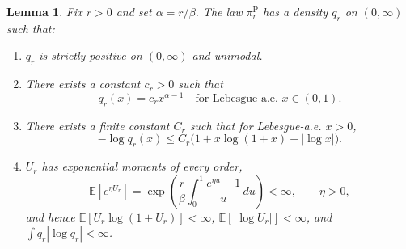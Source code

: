 \documentclass{article}
\newtheorem{lemma}{Lemma}[section]
\newcommand{\E}{\mathbb{E}}
\begin{document}
\begin{lemma}
\label{lem:app-1d-density}
Fix $r>0$ and set $\alpha=r/\beta$. The law $\pi_r^{\mathrm P}$ has a density
$q_r$ on $(0,\infty)$ such that:
{\renewcommand{\labelenumi}{\textnormal{(\roman{enumi})}}
\begin{enumerate}
\item $q_r$ is strictly positive on $(0,\infty)$ and unimodal.
\item There exists a constant $c_r>0$ such that
\[
q_r(x)=c_r x^{\alpha-1}
\quad\text{for Lebesgue-a.e. }x\in(0,1).
\]
\item There exists a finite constant $C_r$ such that for Lebesgue-a.e.
$x>0$,
\begin{equation}\label{eq:app-global-log-q}
-\log q_r(x)\le C_r\bigl(1+x\log(1+x)+|\log x|\bigr).
\end{equation}
\item $U_r$ has exponential moments of every order,
\begin{equation}\label{eq:app-mgf-Ur}
\E[e^{\eta U_r}]
=\exp\!\left(\frac{r}{\beta}\int_0^1\frac{e^{\eta u}-1}{u}\,du\right)
<\infty,
\qquad \eta>0,
\end{equation}
and hence
$\E[U_r\log(1+U_r)]<\infty$, $\E[|\log U_r|]<\infty$, and
$\int q_r|\log q_r|<\infty$.
\end{enumerate}
}
\end{lemma}
\end{document}
